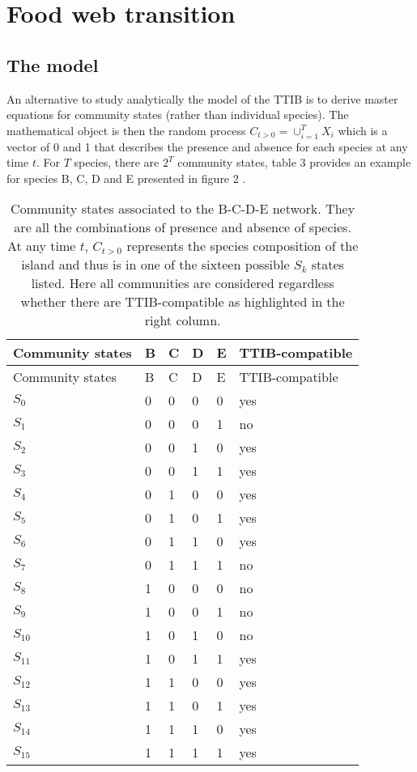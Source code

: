 \label{annII}
\addtocounter{chapter}{3}
\setcounter{equation}{0}

\section{Food web transition}\label{food-web-transition}

\subsection{The model}\label{the-model}

An alternative to study analytically the model of the TTIB is to derive
master equations for community states (rather than individual species).
The mathematical object is then the random process
\(C_{t>0}=\cup_{i=1}^TX_i\) which is a vector of 0 and 1 that describes
the presence and absence for each species at any time \(t\). For \(T\)
species, there are \(2^T\) community states, table 3 provides an example
for species B, C, D and E presented in figure 2 .

\begin{longtable}[]{@{}llllll@{}}
\caption{Community states associated to the B-C-D-E network. They are
all the combinations of presence and absence of species. At any time
\(t\), \(C_{t>0}\) represents the species composition of the island and
thus is in one of the sixteen possible \(S_k\) states listed. Here all
communities are considered regardless whether there are TTIB-compatible
as highlighted in the right column.}\tabularnewline
\toprule
Community states & B & C & D & E & TTIB-compatible\tabularnewline
\midrule
\endfirsthead
\toprule
Community states & B & C & D & E & TTIB-compatible\tabularnewline
\midrule
\endhead
\(S_{0}\) & 0 & 0 & 0 & 0 & yes\tabularnewline
\(S_{1}\) & 0 & 0 & 0 & 1 & no\tabularnewline
\(S_{2}\) & 0 & 0 & 1 & 0 & yes\tabularnewline
\(S_{3}\) & 0 & 0 & 1 & 1 & yes\tabularnewline
\(S_{4}\) & 0 & 1 & 0 & 0 & yes\tabularnewline
\(S_{5}\) & 0 & 1 & 0 & 1 & yes\tabularnewline
\(S_{6}\) & 0 & 1 & 1 & 0 & yes\tabularnewline
\(S_{7}\) & 0 & 1 & 1 & 1 & no\tabularnewline
\(S_{8}\) & 1 & 0 & 0 & 0 & no\tabularnewline
\(S_{9}\) & 1 & 0 & 0 & 1 & no\tabularnewline
\(S_{10}\) & 1 & 0 & 1 & 0 & no\tabularnewline
\(S_{11}\) & 1 & 0 & 1 & 1 & yes\tabularnewline
\(S_{12}\) & 1 & 1 & 0 & 0 & yes\tabularnewline
\(S_{13}\) & 1 & 1 & 0 & 1 & yes\tabularnewline
\(S_{14}\) & 1 & 1 & 1 & 0 & yes\tabularnewline
\(S_{15}\) & 1 & 1 & 1 & 1 & yes\tabularnewline
\bottomrule
\end{longtable}

